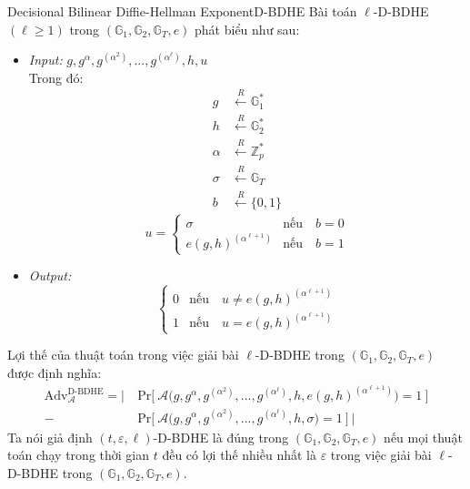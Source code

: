 \documentclass[class=report, crop=false]{standalone}
\begin{document}
		\begin{problem}{Decisional Bilinear Diffie-Hellman Exponent}{D-BDHE}
			Bài toán $\ell$-D-BDHE $(\ell \geq 1)$ trong $(\mathbb{G}_1, \mathbb{G}_2, \mathbb{G}_T, e)$ phát biểu như sau:
			\vspace{-\baselineskip}
			\begin{itemize}[leftmargin=1.5cm, itemindent=-0.5cm]
				\item[] \textit{Input:} $g, g^\alpha, g^{(\alpha^2)}, ..., g^{(\alpha^\ell)}, h, u$ \\
				Trong đó: \vspace{-\baselineskip}
				\begin{align*}
					g 		&\xleftarrow{R} \mathbb{G}_1^* \\
					h 		&\xleftarrow{R} \mathbb{G}_2^* \\
					\alpha 	&\xleftarrow{R} \mathbb{Z}_p^* \\
					\sigma 	&\xleftarrow{R} \mathbb{G}_T \\
					b 		&\xleftarrow{R} \{ 0, 1 \}
				\end{align*}
				\[
					u = \begin{cases}
						\sigma 							&\text{nếu}\quad b = 0 \\
						e(g, h)^{(\alpha^{\ell + 1})} 	&\text{nếu}\quad b = 1
					\end{cases}
				\]
				\item[] \textit{Output:}
				\[
					\begin{cases}
						0 &\text{nếu}\quad u \neq e(g, h)^{(\alpha^{\ell + 1})} \\
						1 &\text{nếu}\quad u = e(g, h)^{(\alpha^{\ell + 1})}
					\end{cases}
				\] 
			\end{itemize}
			\vspace{-\baselineskip}\par
			Lợi thế của thuật toán \algo trong việc giải bài $\ell$-D-BDHE trong $(\mathbb{G}_1, \mathbb{G}_2, \mathbb{G}_T, e)$ được định nghĩa:
			\begin{equation*}
				\begin{split}
					\text{Adv}_{\mathcal{A}}^{\text{D-BDHE}} = \Bigg|\ &\text{Pr}\bigg[ \ \mathcal{A}\Big(g, g^\alpha, g^{(\alpha^2)}, ..., g^{(\alpha^\ell)}, h, e(g, h)^{(\alpha^{\ell + 1})} \Big) = 1 \ \bigg] \\
					- &\text{Pr}\bigg[ \ \mathcal{A}\Big(g, g^\alpha, g^{(\alpha^2)}, ..., g^{(\alpha^\ell)}, h, \sigma \Big) = 1 \ \bigg]\ \Bigg|
				\end{split}
			\end{equation*} \indent
			Ta nói giả định $(t, \varepsilon, \ell)$-D-BDHE là đúng trong $(\mathbb{G}_1, \mathbb{G}_2, \mathbb{G}_T, e)$ nếu mọi thuật toán chạy trong thời gian $t$ đều có lợi thế nhiều nhất là $\varepsilon$ trong việc giải bài $\ell$-D-BDHE trong $(\mathbb{G}_1, \mathbb{G}_2, \mathbb{G}_T, e)$.
		\end{problem}
\end{document}
